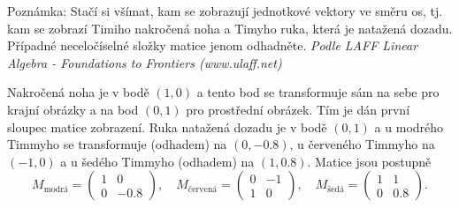 
Poznámka: Stačí si všímat, kam se zobrazují jednotkové vektory ve směru os, tj. kam se zobrazí Timiho nakročená noha a Timyho ruka, která je natažená dozadu. Případné neceločíselné složky matice jenom odhadněte. \textit{Podle LAFF Linear Algebra - Foundations to Frontiers (www.ulaff.net)}

\reseni

Nakročená noha je v bodě $(1,0)$ a tento bod se transformuje sám na sebe pro krajní obrázky a na bod $(0,1)$ pro prostřední obrázek. Tím je dán první sloupec matice zobrazení. Ruka natažená dozadu je v bodě $(0,1)$ a u modrého Timmyho se transformuje (odhadem) na $(0,-0.8)$, u červeného Timmyho na $(-1,0)$ a u šedého Timmyho (odhadem) na $(1,0.8)$. Matice jsou postupně
\begin{equation*}
  M_{\text{modrá}}=
  \begin{pmatrix}
    1 & 0
    \\
    0 &-0.8
  \end{pmatrix},
\quad
  M_{\text{červená}}=
  \begin{pmatrix}
    0 & -1
    \\
    1 & 0
  \end{pmatrix},\quad
  M_{\text{šedá}}=
  \begin{pmatrix}
    1 & 1
    \\
    0 & 0.8
  \end{pmatrix}.
\end{equation*}

